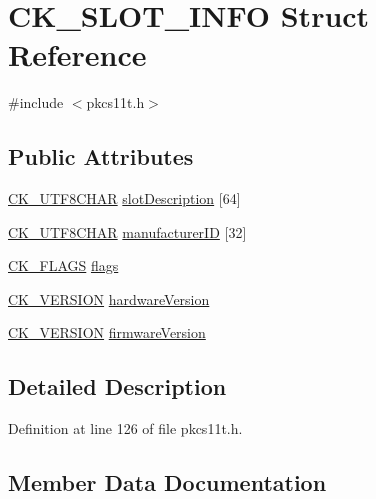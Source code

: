 \hypertarget{struct_c_k___s_l_o_t___i_n_f_o}{}\section{C\+K\+\_\+\+S\+L\+O\+T\+\_\+\+I\+N\+FO Struct Reference}
\label{struct_c_k___s_l_o_t___i_n_f_o}


{\ttfamily \#include $<$pkcs11t.\+h$>$}

\subsection*{Public Attributes}
\begin{DoxyCompactItemize}
\item 
\hyperlink{pkcs11t_8h_a0b0f8118c33f8a96a6af834bbab1df0c}{C\+K\+\_\+\+U\+T\+F8\+C\+H\+AR} \hyperlink{struct_c_k___s_l_o_t___i_n_f_o_a54a968ef99d631f025b426d32fe13648}{slot\+Description} \mbox{[}64\mbox{]}
\item 
\hyperlink{pkcs11t_8h_a0b0f8118c33f8a96a6af834bbab1df0c}{C\+K\+\_\+\+U\+T\+F8\+C\+H\+AR} \hyperlink{struct_c_k___s_l_o_t___i_n_f_o_ab76f9ea77a8903171f203519550b89c8}{manufacturer\+ID} \mbox{[}32\mbox{]}
\item 
\hyperlink{pkcs11t_8h_a53850492c1ba57aca4332be791a3c6a3}{C\+K\+\_\+\+F\+L\+A\+GS} \hyperlink{struct_c_k___s_l_o_t___i_n_f_o_a21bfc612263b8eb1d1773695872fc181}{flags}
\item 
\hyperlink{struct_c_k___v_e_r_s_i_o_n}{C\+K\+\_\+\+V\+E\+R\+S\+I\+ON} \hyperlink{struct_c_k___s_l_o_t___i_n_f_o_aad99fb4180cd096d7ba0b9592b19445a}{hardware\+Version}
\item 
\hyperlink{struct_c_k___v_e_r_s_i_o_n}{C\+K\+\_\+\+V\+E\+R\+S\+I\+ON} \hyperlink{struct_c_k___s_l_o_t___i_n_f_o_a32f9a9f097841afa2064c0b1a00b77fd}{firmware\+Version}
\end{DoxyCompactItemize}


\subsection{Detailed Description}


Definition at line 126 of file pkcs11t.\+h.



\subsection{Member Data Documentation}
\mbox{\label{struct_c_k___s_l_o_t___i_n_f_o_a32f9a9f097841afa2064c0b1a00b77fd}} 
